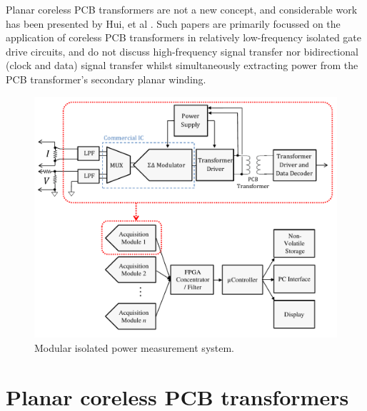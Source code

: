 \documentclass[conference]{IEEEtran}
\begin{document}
Planar coreless PCB transformers are not a new concept, and considerable work has been presented by Hui, et al \cite{TangHuiFundamental}.  Such papers are primarily focussed on the application of coreless PCB transformers in relatively low-frequency isolated gate drive circuits, and do not discuss high-frequency signal transfer nor bidirectional (clock and data) signal transfer whilst simultaneously extracting power from the PCB transformer's secondary planar winding.

\begin{figure}[t]
	\centering
	\includegraphics[width=1\columnwidth]{./img/FullSystem_BasicCol}
	\caption{Modular isolated power measurement system.}
	\label{fig:FullSystem}
\end{figure}

\section{Planar coreless PCB transformers}
\end{document}
